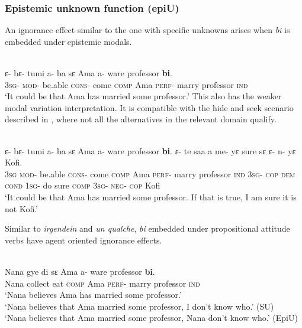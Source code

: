\documentclass[output=paper,modfonts,nonflat,draftmode]{langsci/langscibook}
\begin{document}
\subsubsection{Epistemic unknown function (epiU)}
An ignorance effect similar to the one with specific unknowns arises when \emph{bi} is embedded under epistemic modals.

\ea\label{owusu:ex42a}\\
 \gll  ε- bε- tumi a- ba sε Ama a- ware professor \textbf{bi}. 
\\
\textsc{3sg}- \textsc{mod}- be.able \textsc{cons}- come \textsc{comp} Ama \textsc{perf}- marry professor \textsc{ind} \\
    
\glt `It could be that Ama has married some professor.' 
\z 
This also has the weaker modal variation interpretation. It is compatible with the hide and seek scenario described in \citet{AloniPort2015}, where not all the alternatives in the relevant domain qualify.

\ea\label{owusu:ex42b}\\
 \gll  ε- bε- tumi a- ba sε Ama a- ware professor \textbf{bi}. ε- te saa a  me- yε sure sε ε- n- yε Kofi. \\
\textsc{3sg} 
 \textsc{mod}- be.able \textsc{cons}- come \textsc{comp} Ama \textsc{perf}- marry professor \textsc{ind} \textsc{3sg}- \textsc{cop} \textsc{dem} \textsc{cond} \textsc{1sg}- do sure \textsc{comp}  \textsc{3sg}- \textsc{neg}- \textsc{cop} Kofi\\
\glt `It could be that Ama has married some professor. If that is true, I am sure it is not Kofi.' 
\z 

Similar to \emph{irgendein} and \emph{un qualche}, \emph{bi} embedded under propositional attitude verbs have agent oriented ignorance effects.  

 \ea\label{owusu:ex42c}\\
 \gll  Nana gye di sε Ama a- ware professor \textbf{bi}. \\
Nana collect eat \textsc{comp} Ama \textsc{perf}- marry professor \textsc{ind}\\
\glt `Nana believes Ama has married some professor.' \\
`Nana believes that Ama married some professor, I don't know who.' (SU)\\
`Nana believes that Ama married some professor, Nana don't know who.' (EpiU)
\z 
\end{document}
